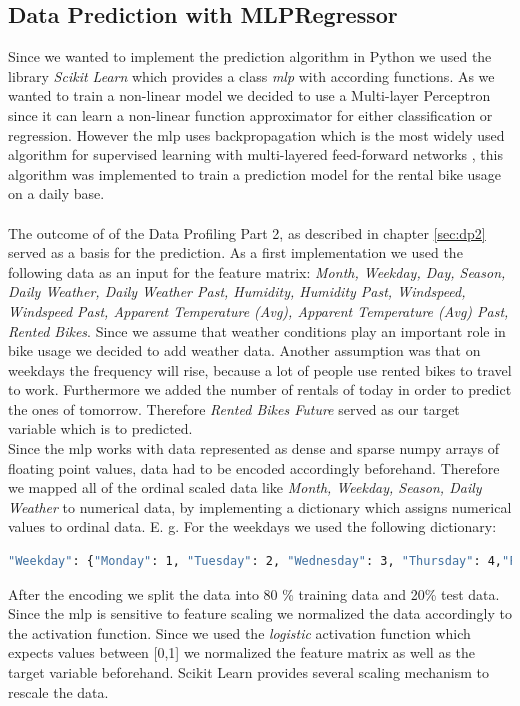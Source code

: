 \subsection{Data Prediction with MLPRegressor}\label{sec:mlp}
Since we wanted to implement the prediction algorithm in Python we used the library \emph{Scikit Learn} which provides a class \emph{\acf{mlp}} with according functions.
As we wanted to train a non-linear model we decided to use a Multi-layer Perceptron since it can learn a non-linear function approximator for either classification or regression. However  the \acs{mlp} uses backpropagation which is the most widely used algorithm for supervised learning with multi-layered feed-forward networks \cite{riedmiller1993direct}, this algorithm was implemented to train a prediction model for the rental bike usage on a daily base.\\\\
The outcome of of the Data Profiling Part 2, as described in chapter \ref{sec:dp2} served as a basis for the prediction.
As a first implementation we used the following data as an input for the feature matrix: \emph{Month, Weekday, Day, Season, Daily Weather, Daily Weather Past, Humidity, Humidity Past, Windspeed, Windspeed Past, Apparent Temperature (Avg), Apparent Temperature (Avg) Past, Rented Bikes}. Since we assume that weather conditions play an important role in bike usage we decided to add weather data. Another assumption was that on weekdays the frequency will rise, because a lot of people use rented bikes to travel to work. Furthermore we added the number of rentals of today in order to predict the ones of tomorrow. Therefore \emph{Rented Bikes Future} served as our target variable which is to predicted.\\
Since the \acs{mlp} works with data represented as dense and sparse numpy arrays of floating point values, data had to be encoded accordingly beforehand. Therefore we mapped all of the ordinal scaled data like \emph{Month, Weekday, Season, Daily Weather} to numerical data, by implementing a dictionary which assigns numerical values to ordinal data. E. g. For the weekdays we used the following dictionary:
\begin{lstlisting}[language=bash,breaklines=true]
"Weekday": {"Monday": 1, "Tuesday": 2, "Wednesday": 3, "Thursday": 4,"Friday": 5, "Saturday": 6, "Sunday":7 }
\end{lstlisting}
After the encoding we split the data into 80 \% training data and 20\% test data.
Since the \acs{mlp} is sensitive to feature scaling we normalized the data accordingly to the activation function. Since we used the \emph{logistic} activation function which expects values between [0,1] we normalized the feature matrix as well as the target variable beforehand. Scikit Learn provides several scaling mechanism to rescale the data. 
